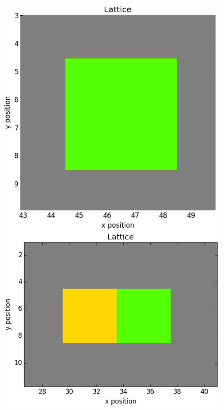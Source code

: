 \documentclass[12pt]{article}
\begin{document}
\begin{figure}[h]
	\centering
	\includegraphics[scale=0.20]{img/1ctc_start}
	\includegraphics[scale=0.20]{img/2ctc_start}

\end{figure}
\end{document}
